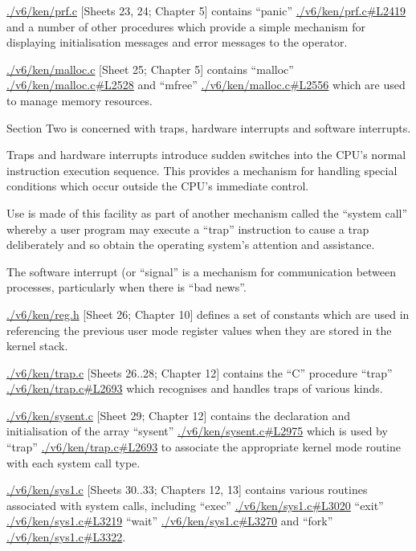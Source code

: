 \item[prf.c] \url{./v6/ken/prf.c} [Sheets 23, 24; Chapter 5]
contains ``panic'' \url{./v6/ken/prf.c#L2419} and a number of
other procedures which provide a
simple mechanism for displaying initialisation 
messages and error messages 
to the operator.

\item[malloc.c] \url{./v6/ken/malloc.c} [Sheet 25; Chapter 5] contains 
``malloc'' \url{./v6/ken/malloc.c#L2528} and ``mfree'' \url{./v6/ken/malloc.c#L2556} which are
used to manage memory resources.
\ed



Section Two is concerned with traps,
hardware interrupts and software interrupts.


Traps and hardware interrupts introduce
sudden switches into the CPU's normal
instruction execution sequence. This
provides a mechanism for handling special 
conditions which occur outside the
CPU's immediate control.

Use is made of this facility as part of
another mechanism called the ``system
call'' whereby a user program may execute 
a ``trap'' instruction to cause a
trap deliberately and so obtain the
operating system's attention and assistance.


The software interrupt (or ``signal'' is
a mechanism for communication between
processes, particularly when there is
``bad news''.

\bd
\item[reg.h] \url{./v6/ken/reg.h} [Sheet 26; Chapter 10] defines
a set of constants which are used in
referencing the previous user mode
register values when they are stored
in the kernel stack.

\item[trap.c] \url{./v6/ken/trap.c} [Sheets 26..28; Chapter 12]
contains the ``C'' procedure ``trap'' \url{./v6/ken/trap.c#L2693}
which recognises and handles traps
of various kinds.

\item[sysent.c] \url{./v6/ken/sysent.c} [Sheet 29; Chapter 12] contains 
the declaration and initialisation 
of the array ``sysent'' \url{./v6/ken/sysent.c#L2975} which
is used by ``trap'' \url{./v6/ken/trap.c#L2693} to associate the
appropriate kernel mode routine with
each system call type.

\item[sysl.c] \url{./v6/ken/sys1.c} [Sheets 30..33; Chapters 12,
13] contains various routines associated 
with system calls, including
``exec'' \url{./v6/ken/sys1.c#L3020} ``exit'' \url{./v6/ken/sys1.c#L3219} ``wait'' \url{./v6/ken/sys1.c#L3270} and ``fork'' \url{./v6/ken/sys1.c#L3322}.

